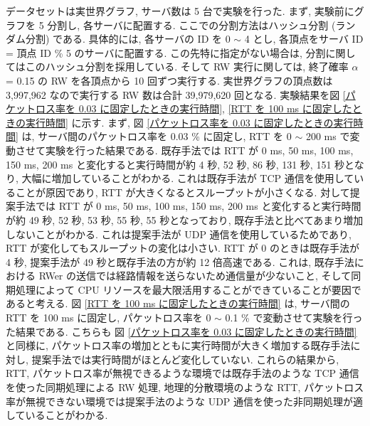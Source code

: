 データセットは実世界グラフ, サーバ数は 5 台で実験を行った. まず, 実験前にグラフを 5 分割し, 各サーバに配置する. ここでの分割方法はハッシュ分割 (ランダム分割) である. 具体的には, 各サーバの ID を 0 $\sim$ 4 とし, 各頂点をサーバ ID = 頂点 ID \% 5 のサーバに配置する. この先特に指定がない場合は, 分割に関してはこのハッシュ分割を採用している. そして RW 実行に関しては, 終了確率 $\alpha$ = 0.15 の RW を各頂点から 10 回ずつ実行する. 実世界グラフの頂点数は 3,997,962 なので実行する RW 数は合計 39,979,620 回となる. 実験結果を図 \ref{パケットロス率を 0.03 に固定したときの実行時間}, \ref{RTT を 100 ms に固定したときの実行時間} に示す. まず, 図 \ref{パケットロス率を 0.03 に固定したときの実行時間} は, サーバ間のパケットロス率を 0.03 \% に固定し, RTT を 0 $\sim$ 200 ms で変動させて実験を行った結果である. 既存手法では RTT が 0 ms, 50 ms, 100 ms, 150 ms, 200 ms と変化すると実行時間が約 4 秒, 52 秒, 86 秒, 131 秒, 151 秒となり, 大幅に増加していることがわかる. これは既存手法が TCP 通信を使用していることが原因であり, RTT が大きくなるとスループットが小さくなる. 対して提案手法では RTT が 0 ms, 50 ms, 100 ms, 150 ms, 200 ms と変化すると実行時間が約 49 秒, 52 秒, 53 秒, 55 秒, 55 秒となっており, 既存手法と比べてあまり増加しないことがわかる. これは提案手法が UDP 通信を使用しているためであり, RTT が変化してもスループットの変化は小さい. RTT が 0 のときは既存手法が 4 秒, 提案手法が 49 秒と既存手法の方が約 12 倍高速である. これは, 既存手法における RWer の送信では経路情報を送らないため通信量が少ないこと, そして同期処理によって CPU リソースを最大限活用することができていることが要因であると考える. 図 \ref{RTT を 100 ms に固定したときの実行時間} は, サーバ間の RTT を 100 ms に固定し, パケットロス率を 0 $\sim$ 0.1 \% で変動させて実験を行った結果である. こちらも 図 \ref{パケットロス率を 0.03 に固定したときの実行時間} と同様に, パケットロス率の増加とともに実行時間が大きく増加する既存手法に対し, 提案手法では実行時間がほとんど変化していない. これらの結果から, RTT, パケットロス率が無視できるような環境では既存手法のような TCP 通信を使った同期処理による RW 処理, 地理的分散環境のような RTT, パケットロス率が無視できない環境では提案手法のような UDP 通信を使った非同期処理が適していることがわかる. 

